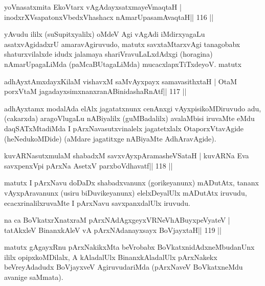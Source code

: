 
\begin{shl}
yoV\s nasatxmita EkoV\s tarx vAgAdayxsatxmayeV\s maqtaH |
inodxrXV\s sapatonxV\s bedxVhashacx nAmarUpasamAvaqtaH\hfill || 116 ||
\end{shl}

\begin{artha}
yAvudu ililx (suSupitxyalilx) oMdeV Agi vAgAdi iMdirxyagaLu asatxvAgidadxrU amaravAgiruvudo, matutx savxtaMtarxvAgi tanagobabx shaturxvilalxde idudx jalamaya shariVravuLaLxdAdxgi (horagina) nAmarUpagaLiMda (paMcaBUtagaLiMda) mucacxlapxTiTxdeyoV. matutx
\end{artha}

\begin{shl}
adhAyxtAmxdayxKilaM vishavxM saMvAyxpayx samavasithxtaH |
OtaM porxVtaM jagadayxsimxnanxranABinidashaRnAtf\hfill || 117 ||
\end{shl}

\begin{artha}
adhAyxtamx modalAda elAlx jagatatxnunx cenAnxgi vAyxpisikoMDiruvudo  adu, (cakarxda) aragoVlugaLu nABiyalilx (guMBadalilx) avalaMbisi  iruvaMte eMdu daqSATxMtadiMda I pArxNavasutxvinalelx jagatetxlalx OtaporxVtavAgide (heNedukoMDide) (aMdare jagatitxge nABiyaMte AdhAravAgide).  
\end{artha}

\begin{shl}
kuvARNasutxmulaM shabadxM savxvAyxpAramasheVSataH |
kuvARNa Eva savxpenxV\s pi pArxNa AsetxV parxboVdhavatf\hfill || 118 ||
\end{shl}

\begin{artha}
matutx I pArxNavu doDaDx shabadxvanunx (gorikeyanunx) mADutAtx, tananx vAyxpAravanunx (usiru biDuvikeyanunx) elelxDeyalUlx mADutAtx iruvudu, ecacxrinalilxruvaMte I pArxNavu savxpanxdalUlx iruvudu.
\end{artha}

\begin{shl}
na ca BoVkatxrXnatxraM pArxNAdAgxgeyxVRNeVhABuyxpeVyateV |
tatAkxleV BinanxkAleV vA pArxNAdanayxsayx BoVjayxtaH\hfill || 119 ||
\end{shl}

\begin{artha}
matutx gAgayxRnu pArxNakikxMta beVrobabx BoVkatxnidAdxneMbudanUnx ililx  opipxkoMDilalx, A kAladalUlx BinanxkAladalUlx pArxNakekx beVreyAdadudx BoVjayxveV AgiruvudariMda (pArxNaveV BoVkatxneMdu avanige saMmata).
\end{artha}

